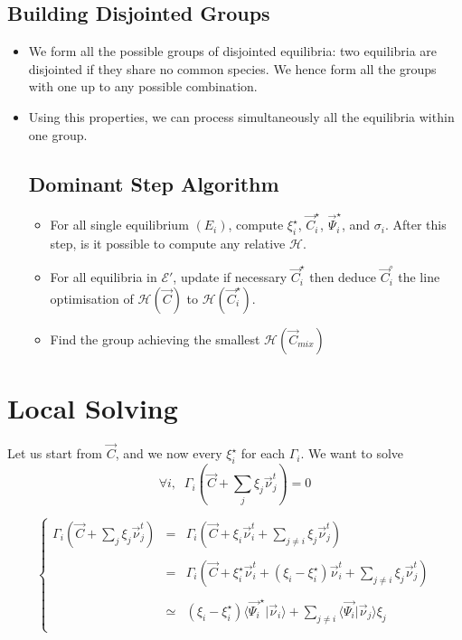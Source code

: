 \documentclass[aps,12pt]{revtex4}
\begin{document}
\subsection{Building Disjointed Groups}
\begin{itemize}
\item
We form all the possible groups of disjointed equilibria: two equilibria are disjointed if they share no common species.
We hence form all the groups with one up to any possible combination.

\item Using this properties, we can process simultaneously all the equilibria within one group.

\subsection{Dominant Step Algorithm}

\begin{itemize}
\item For all single equilibrium $(E_i)$, compute $\xi_i^\star$, $\vec{C}_i^\star$, $\vec{\Psi}_i^\star$, and $\sigma_i$. After
this step, is it possible to compute any relative $\mathcal{H}$.
\item For all equilibria in $\mathcal{E}'$, update if necessary $\vec{C}_i^\star$ then deduce $\vec{C}_i^\circ$ the
line optimisation of $\mathcal{H}(\vec{C})$ to $\mathcal{H}(\vec{C}_i^\star)$.
\item Find the group achieving the smallest  $\mathcal{H}(\vec{C}_{mix})$
\end{itemize}



\end{itemize} 
 
 
\section{Local Solving}

Let us start from $\vec{C}$, and we now every $\xi_i^\star$ for each $\Gamma_i$.
We want to solve
\begin{equation}
\forall i, \;\; \Gamma_i\left(\vec{C} + \sum_j \xi_j \vec{\nu}^t_j\right) =  0
\end{equation}

\begin{equation}
\left\lbrace
\begin{array}{rcl}
\Gamma_i\left(\vec{C} + \sum_j \xi_j \vec{\nu}^t_j\right) & = &  \displaystyle \Gamma_i\left(\vec{C} + \xi_i \vec{\nu}_i^t + \sum_{j\not=i} \xi_j \vec{\nu}^t_j\right)\\
\\
& = & \displaystyle\Gamma_i\left(\vec{C} + \xi_i^\star \vec{\nu}_i^t + (\xi_i-\xi_i^\star) \vec{\nu}_i^t + \sum_{j\not=i} \xi_j \vec{\nu}^t_j\right)\\
\\
& \simeq & \displaystyle (\xi_i-\xi_i^\star) \langle \vec{\Psi_i}^\star \vert \vec{\nu}_i \rangle  + \sum_{j\not=i} \langle \vec{\Psi_i} \vert \vec{\nu}_j  \rangle \xi_j\\
\end{array}
\right.
\end{equation}
\end{document}
